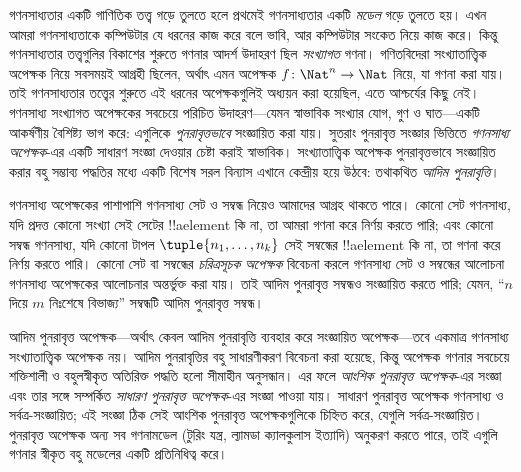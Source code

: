 \documentclass[../../../include/open-logic-section]{subfiles}
\begin{document}

গণনসাধ্যতার একটি গাণিতিক তত্ত্ব গড়ে তুলতে হলে প্রথমেই গণনসাধ্যতার
একটি \emph{মডেল} গড়ে তুলতে হয়। এখন আমরা গণনসাধ্যতাকে কম্পিউটার যে
ধরনের কাজ করে বলে ভাবি, আর কম্পিউটার সংকেত নিয়ে কাজ করে। কিন্তু
গণনসাধ্যতার তত্ত্বগুলির বিকাশের শুরুতে গণনার আদর্শ উদাহরণ ছিল
\emph{সংখ্যাগত} গণনা। গণিতবিদেরা সংখ্যাতাত্ত্বিক অপেক্ষক নিয়ে সবসময়ই
আগ্রহী ছিলেন, অর্থাৎ এমন অপেক্ষক $f\colon \Nat^n \to \Nat$ নিয়ে, যা
গণনা করা যায়। তাই গণনসাধ্যতার তত্ত্বের শুরুতে এই ধরনের অপেক্ষকগুলিই
অধ্যয়ন করা হয়েছিল, এতে আশ্চর্যের কিছু নেই। গণনসাধ্য সংখ্যাগত অপেক্ষকের
সবচেয়ে পরিচিত উদাহরণ—যেমন স্বাভাবিক সংখ্যার যোগ, গুণ ও ঘাত—একটি
আকর্ষণীয় বৈশিষ্ট্য ভাগ করে: এগুলিকে \emph{পুনরাবৃত্তভাবে} সংজ্ঞায়িত
করা যায়। সুতরাং পুনরাবৃত্ত সংজ্ঞার ভিত্তিতে \emph{গণনসাধ্য অপেক্ষক}-এর
একটি সাধারণ সংজ্ঞা দেওয়ার চেষ্টা করাই স্বাভাবিক। সংখ্যাতাত্ত্বিক অপেক্ষক
পুনরাবৃত্তভাবে সংজ্ঞায়িত করার বহু সম্ভাব্য পদ্ধতির মধ্যে একটি বিশেষ
সরল বিন্যাস এখানে কেন্দ্রীয় হয়ে উঠবে: তথাকথিত \emph{আদিম পুনরাবৃত্তি}।

গণনসাধ্য অপেক্ষকের পাশাপাশি গণনসাধ্য সেট ও সম্বন্ধ নিয়েও আমাদের আগ্রহ
থাকতে পারে। কোনো সেট গণনসাধ্য, যদি প্রদত্ত কোনো সংখ্যা সেই সেটের !!a{element}
কি না, তা আমরা গণনা করে নির্ণয় করতে পারি; এবং কোনো সম্বন্ধ গণনসাধ্য,
যদি কোনো টাপল $\tuple{n_1, \dots, n_k}$ সেই সম্বন্ধের !!a{element} কি না,
তা গণনা করে নির্ণয় করতে পারি। কোনো সেট বা সম্বন্ধের \emph{চরিত্রসূচক
অপেক্ষক} বিবেচনা করলে গণনসাধ্য সেট ও সম্বন্ধের আলোচনা গণনসাধ্য অপেক্ষকের
আলোচনার অন্তর্ভুক্ত করা যায়। তাই আদিম পুনরাবৃত্ত সম্বন্ধও সংজ্ঞায়িত
করতে পারি; যেমন, “$n$ দিয়ে $m$ নিঃশেষে বিভাজ্য” সম্বন্ধটি আদিম
পুনরাবৃত্ত সম্বন্ধ।

আদিম পুনরাবৃত্ত অপেক্ষক—অর্থাৎ কেবল আদিম পুনরাবৃত্তি ব্যবহার করে
সংজ্ঞায়িত অপেক্ষক—তবে একমাত্র গণনসাধ্য সংখ্যাতাত্ত্বিক অপেক্ষক নয়।
আদিম পুনরাবৃত্তির বহু সাধারণীকরণ বিবেচনা করা হয়েছে, কিন্তু অপেক্ষক
গণনার সবচেয়ে শক্তিশালী ও বহুলস্বীকৃত অতিরিক্ত পদ্ধতি হলো সীমাহীন
অনুসন্ধান। এর ফলে \emph{আংশিক পুনরাবৃত্ত অপেক্ষক}-এর সংজ্ঞা এবং তার
সঙ্গে সম্পর্কিত \emph{সাধারণ পুনরাবৃত্ত অপেক্ষক}-এর সংজ্ঞা পাওয়া যায়।
সাধারণ পুনরাবৃত্ত অপেক্ষক গণনসাধ্য ও সর্বত্র-সংজ্ঞায়িত; এই সংজ্ঞা ঠিক
সেই আংশিক পুনরাবৃত্ত অপেক্ষকগুলিকে চিহ্নিত করে, যেগুলি সর্বত্র-সংজ্ঞায়িত।
পুনরাবৃত্ত অপেক্ষক অন্য সব গণনামডেল (টুরিং যন্ত্র, ল্যামডা ক্যালকুলাস
ইত্যাদি) অনুকরণ করতে পারে, তাই এগুলি গণনার স্বীকৃত বহু মডেলের একটি
প্রতিনিধিত্ব করে।
\end{document}
